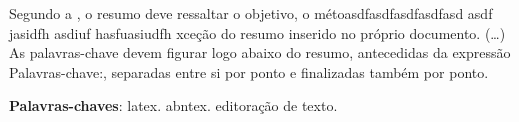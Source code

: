  \setlength{\absparsep}{18pt} %
 \begin{resumo}
 Segundo a , o resumo deve ressaltar o
 objetivo, o m\'{e}toasdfasdfasdfasdfasd asdf jasidfh asdiuf hasfuasiudfh xce\c{c}\~{a}o do resumo inserido no
 pr\'{o}prio documento. (\ldots) As palavras-chave devem figurar logo abaixo do
 resumo, antecedidas da express\~{a}o Palavras-chave:, separadas entre si por
 ponto e finalizadas tamb\'{e}m por ponto.

 \noindent
 \textbf{Palavras-chaves}: latex. abntex. editora\c{c}\~{a}o de texto. 
 \end{resumo}